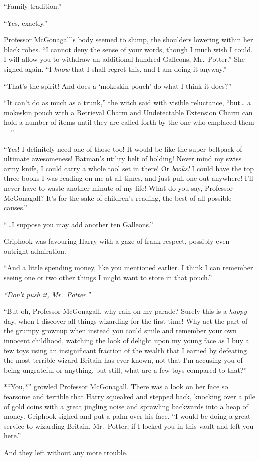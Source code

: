 ``Family tradition.''

``Yes, exactly.''

Professor McGonagall's body seemed to slump, the shoulders lowering
within her black robes. ``I cannot deny the sense of your words, though
I much wish I could. I will allow you to withdraw an additional hundred
Galleons, Mr.~Potter.'' She sighed again. ``I \emph{know} that I shall
regret this, and I am doing it anyway.''

``That's the spirit! And does a `mokeskin pouch' do what I think it
does?''

``It can't do as much as a trunk,'' the witch said with visible
reluctance, ``but\ldots{} a mokeskin pouch with a Retrieval Charm and
Undetectable Extension Charm can hold a number of items until they are
called forth by the one who emplaced them---''

``Yes! I definitely need one of those too! It would be like the super
beltpack of ultimate awesomeness! Batman's utility belt of holding!
Never mind my swiss army knife, I could carry a whole tool set in there!
Or \emph{books!} I could have the top three books I was reading on me at
all times, and just pull one out anywhere! I'll never have to waste
another minute of my life! What do you say, Professor McGonagall? It's
for the sake of children's reading, the best of all possible causes.''

``\ldots{}I suppose you may add another ten Galleons.''

Griphook was favouring Harry with a gaze of frank respect, possibly even
outright admiration.

``And a little spending money, like you mentioned earlier. I think I can
remember seeing one or two other things I might want to store in that
pouch.''

\emph{``Don't push it, Mr.~Potter.''}

``But oh, Professor McGonagall, why rain on my parade? Surely this is a
\emph{happy} day, when I discover all things wizarding for the first
time! Why act the part of the grumpy grownup when instead you could
smile and remember your own innocent childhood, watching the look of
delight upon my young face as I buy a few toys using an insignificant
fraction of the wealth that I earned by defeating the most terrible
wizard Britain has ever known, not that I'm accusing you of being
ungrateful or anything, but still, what are a few toys compared to
that?''

*``You,*'' growled Professor McGonagall. There was a look on her face so
fearsome and terrible that Harry squeaked and stepped back, knocking
over a pile of gold coins with a great jingling noise and sprawling
backwards into a heap of money. Griphook sighed and put a palm over his
face. ``I would be doing a great service to wizarding Britain,
Mr.~Potter, if I locked you in this vault and left you here.''

And they left without any more trouble.
